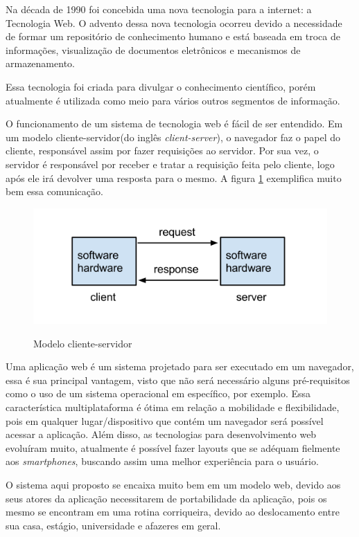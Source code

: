 Na década de 1990 foi concebida uma nova tecnologia para a internet: a Tecnologia Web\cite{zaneti2005construcao}. O advento dessa nova tecnologia ocorreu devido a necessidade de formar um repositório de conhecimento humano \cite{lee1994www} e está baseada em troca de informações, visualização de documentos eletrônicos e mecanismos de armazenamento. \par
Essa tecnologia foi criada para divulgar o conhecimento científico, porém atualmente é utilizada como meio para vários outros segmentos de informação\cite{zaneti2005construcao}. \par
O funcionamento de um sistema de tecnologia web é fácil de ser entendido. Em um modelo cliente-servidor(do inglês \textit{client-server}), o navegador faz o papel do cliente, responsável assim por fazer requisições ao servidor. Por sua vez, o servidor é responsável por receber e tratar a requisição feita pelo cliente, logo após ele irá devolver uma resposta para o mesmo\cite{sousa2016desenvolvimento}. A figura \ref{fig:web} exemplifica muito bem essa comunicação.

\begin{figure}[htbp!]
  \centering
  \caption{Modelo cliente-servidor}
  \includegraphics[width=1\textwidth]{figs/web.png}
    \label{fig:web}
\end{figure}

Uma aplicação web é um sistema projetado para ser executado em um navegador, essa é sua principal vantagem, visto que não será necessário alguns pré-requisitos como o uso de um sistema operacional em específico, por exemplo. Essa característica multiplataforma é ótima em relação a mobilidade e flexibilidade, pois em qualquer lugar/dispositivo que contém um navegador será possível acessar a aplicação. Além disso, as tecnologias para desenvolvimento web evoluíram muito, atualmente é possível fazer layouts que se adéquam fielmente aos \textit{smartphones}, buscando assim uma melhor experiência para o usuário\cite{pandey2013responsive}. \par
O sistema aqui proposto se encaixa muito bem em um modelo web, devido aos seus atores da aplicação necessitarem de portabilidade da aplicação, pois os mesmo se encontram em uma rotina corriqueira, devido ao deslocamento entre sua casa, estágio, universidade e afazeres em geral.

